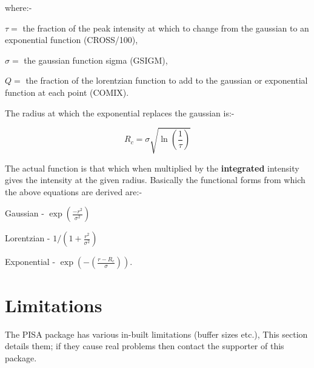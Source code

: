 where:-

$\tau=$ the fraction of the peak intensity at which to change from the
gaussian to an exponential function (CROSS/100),

$\sigma=$ the gaussian function sigma (GSIGM),

$Q=$ the fraction of the lorentzian function to add to the gaussian or
exponential function at each point (COMIX).

The radius at which the exponential replaces the gaussian is:-

\begin{displaymath}
R_{c}=\sigma\sqrt{\ln(\frac{1}{\tau})}
\end{displaymath}

The actual function is that which when multiplied by the {\bf
integrated} intensity gives the intensity at the given radius. Basically the 
functional forms from which the above equations are derived are:-

Gaussian - $\exp(\frac{-r^{2}}{\sigma^{2}})$

Lorentzian - $1/(1+\frac{r^{2}}{\sigma^{2}})$

Exponential - $\exp(-(\frac{r-R_{c}}{\sigma}))$.

\section{Limitations}

The PISA package has various in-built limitations (buffer sizes etc.), This
section details them; if they cause real problems then contact the supporter of
this package.

